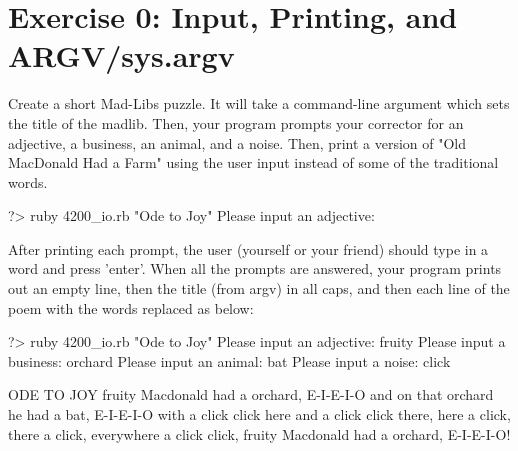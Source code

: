 \documentclass{42-en}
\begin{document}

\startexercices


\chapter{Exercise 0: Input, Printing, and ARGV/sys.argv}

\exnumber{\exercicenumber}
\makeheaderfiles

Create a short Mad-Libs puzzle. It will take a command-line argument which sets the title of the madlib. Then, your program prompts your corrector for an adjective, a business, an animal, and a noise. Then, print a version of "Old MacDonald Had a Farm" using the user input instead of some of the traditional words.

\begin{42console}
	?> ruby 4200_io.rb "Ode to Joy"
	Please input an adjective:
\end{42console}

After printing each prompt, the user (yourself or your friend) should type in a word and press 'enter'. When all the prompts are answered, your program prints out an empty line, then the title (from argv) in all caps, and then each line of the poem with the words replaced as below:

\begin{42console}
	?> ruby 4200_io.rb "Ode to Joy"
	Please input an adjective: fruity
	Please input a business: orchard
	Please input an animal: bat
	Please input a noise: click

	ODE TO JOY
	fruity Macdonald had a orchard, E-I-E-I-O
	and on that orchard he had a bat, E-I-E-I-O
	with a click click here
	and a click click there,
	here a click, there a click,
	everywhere a click click,
	fruity Macdonald had a orchard, E-I-E-I-O! 
\end{42console}
\nextexercice
\end{document}

